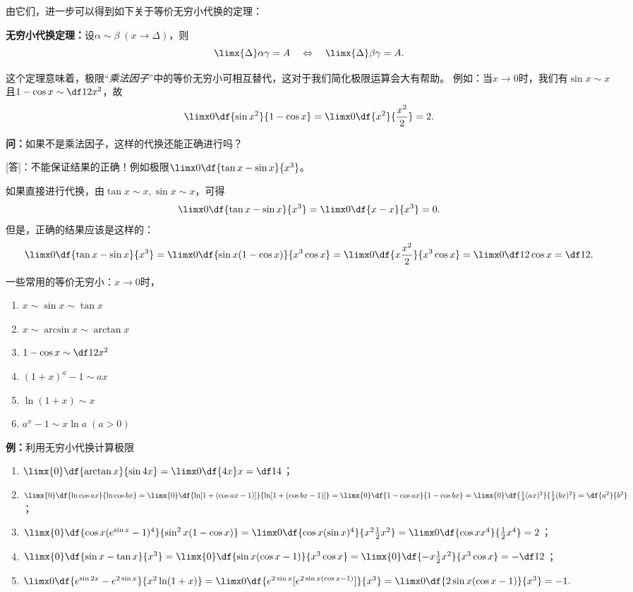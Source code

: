 由它们，进一步可以得到如下关于等价无穷小代换的定理：

\begin{thx}
	{\bf 无穷小代换定理：}设$\alpha\sim \beta\;(x\to\Delta)$，则
	$$\limx{\Delta}\alpha\gamma=A
	\quad\Leftrightarrow\quad\limx{\Delta}\beta\gamma=A.$$
\end{thx}

这个定理意味着，极限“{\it 乘法因子}”中的等价无穷小可相互替代，这对于我们简化极限运算会大有帮助。
例如：当$x\to 0$时，我们有$\sin x\sim x$且$1-\cos x\sim\df12x^2$，故
$$\limx0\df{\sin x^2}{1-\cos x}=\limx0\df{x^2}{\frac{x^2}2}=2.$$

{\bf 问：}如果不是乘法因子，这样的代换还能正确进行吗？

[答]：不能保证结果的正确！例如极限$\limx0\df{\tan x-\sin x}{x^3}$。

如果直接进行代换，由$\tan x\sim x,\sin x\sim x$，可得
$$\limx0\df{\tan x-\sin x}{x^3}=\limx0\df{x-x}{x^3}=0.$$
但是，正确的结果应该是这样的：
$$
	\limx0\df{\tan x-\sin x}{x^3}
	=\limx0\df{\sin x(1-\cos x)}{x^3\cos x}
	=\limx0\df{x\frac{x^2}2}{x^3\cos x}
	=\limx0\df1{2\cos x}=\df12.
$$

\begin{thx}
	一些常用的等价无穷小：$x\to 0$时，
	\begin{enumerate}[(1)]
	  \item $x\sim \sin x\sim \tan x$ 
	  \item $x \sim\arcsin x\sim\arctan x$ 
	  \item $1-\cos x\sim \df 12 x^2$ 
	  \item $(1+x)^a-1\sim ax$ 
	  \item $\ln(1+x)\sim x$ 
	  \item $a^x-1\sim x\ln a\;(a>0)$
	\end{enumerate}
\end{thx}

{\bf 例：}利用无穷小代换计算极限
\begin{enumerate}[(1)]
  \setlength{\itemindent}{1cm}
  \item $\limx{0}\df{\arctan x}{\sin 4x}=\limx0\df{4x}x=\df14$； 
  \item $\limx{0}\df{\ln\cos ax}{\ln\cos bx}
  =\limx{0}\df{\ln[1+(\cos ax-1)]}{\ln[1+(\cos bx-1)]}
  =\limx{0}\df{1-\cos ax}{1-\cos bx}
  =\limx{0}\df{\frac12(ax)^2}{\frac12(bx)^2}
  =\df{a^2}{b^2}$；
  \item $\limx{0}\df{\cos x(e^{\sin x}-1)^4}{\sin^2 x(1-\cos x)}
  =\limx0\df{\cos x(\sin x)^4}{x^2\frac12x^2}
  =\limx0\df{\cos x x^4}{\frac12x^4} =2$； 
  \item $\limx{0}\df{\sin x-\tan x}{x^3}
  =\limx{0}\df{\sin x(\cos x-1)}{x^3\cos  x}
  =\limx{0}\df{-x\frac12x^2}{x^3\cos  x}=-\df12$；
  \item $\limx0\df{e^{\sin2x}-e^{2\sin x}}{x^2\ln(1+x)}
  =\limx0\df{e^{2\sin x}[e^{2\sin x(\cos x-1)}]}{x^3}
  =\limx0\df{2\sin x(\cos x-1)}{x^3}=-1.
  $
\end{enumerate}

